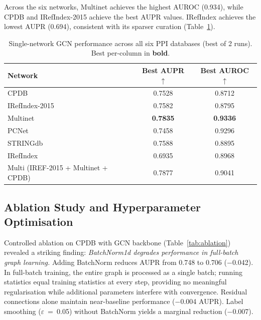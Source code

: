 Across the six networks, Multinet achieves the highest AUROC (0.934), while CPDB
and IRefIndex-2015 achieve the best AUPR values. IRefIndex achieves the lowest
AUPR (0.694), consistent with its sparser curation (Table~\ref{tab:pernetwork}).

\begin{table}[ht]
  \centering
  \caption{Single-network GCN performance across all six PPI databases (best of 2
           runs). Best per-column in \textbf{bold}.}
  \label{tab:pernetwork}
  \small
  \begin{tabular}{lcc}
    \toprule
    \textbf{Network} & \textbf{Best AUPR $\uparrow$} & \textbf{Best AUROC $\uparrow$} \\
    \midrule
    CPDB            & 0.7528          & 0.8712 \\
    IRefIndex-2015  & 0.7582          & 0.8795 \\
    Multinet        & \textbf{0.7835} & \textbf{0.9336} \\
    PCNet           & 0.7458          & 0.9296 \\
    STRINGdb        & 0.7588          & 0.8895 \\
    IRefIndex       & 0.6935          & 0.8968 \\
    \midrule
    Multi (IREF-2015 + Multinet + CPDB) & 0.7877 & 0.9041 \\
    \bottomrule
  \end{tabular}
\end{table}

\subsection{Ablation Study and Hyperparameter Optimisation}

Controlled ablation on CPDB with GCN backbone (Table~\ref{tab:ablation}) revealed
a striking finding: \textit{BatchNorm1d degrades performance in full-batch graph
learning.} Adding BatchNorm reduces AUPR from 0.748 to 0.706 ($-$0.042). In
full-batch training, the entire graph is processed as a single batch; running
statistics equal training statistics at every step, providing no meaningful
regularisation while additional parameters interfere with
convergence\cite{graphnorm2021}. Residual connections alone maintain near-baseline
performance ($-$0.004 AUPR). Label smoothing ($\varepsilon$~=~0.05) without
BatchNorm yields a marginal reduction ($-$0.007).

